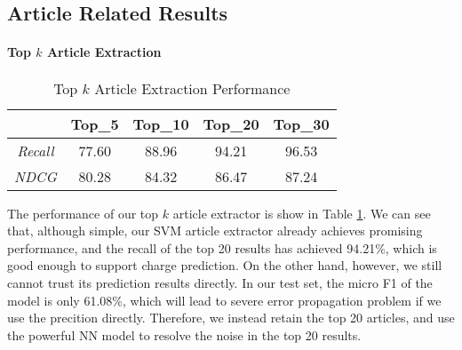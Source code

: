 

\subsection{Article Related Results}
\paragraph{Top $k$ Article Extraction}
\begin{table}
\centering
\normalsize{
\begin{tabular}{|c|c|c|c|c|}
\hline
				& \textbf{Top\_5} 	& \textbf{Top\_10} 		& \textbf{Top\_20} 	& \textbf{Top\_30} \\
\hline
\textit{Recall} 		& 77.60			& 88.96  				& 94.21			& 96.53 	\\
\hline
\textit{NDCG} 		& 80.28			& 84.32  				& 86.47			& 87.24 	\\
\hline
\end{tabular}
}
\caption{Top $k$ Article Extraction Performance}
\label{tab_article_extraction}
\end{table}

The performance of our top $k$ article extractor is show in Table \ref{tab_article_extraction}.
We can see that, although simple, our SVM article extractor already achieves promising performance, and the recall of the top 20 results has achieved 94.21\%, which is good enough to support charge prediction. 
On the other hand, however, we still cannot trust its prediction results directly.  In our test set, the micro F1 of the model is only 61.08\%, which will lead to severe error propagation problem if we use the precition directly. Therefore, we instead retain the top 20 articles, and use the powerful NN model to resolve the noise in the top 20 results.


